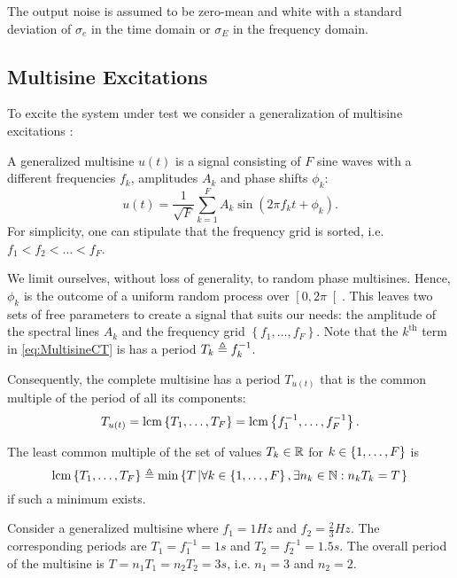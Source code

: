   The output noise is assumed to be zero-mean and white with a
  standard deviation of $\sigma_e$ in the time domain or $\sigma_E$ in the frequency domain.


\subsection{Multisine Excitations}
  To excite the system under test we consider a generalization of multisine excitations \citep{Pintelon2012}:
  \begin{definition} \label{def:generalized-MS}
  A generalized multisine $u(t)$ is a signal consisting of $F$ sine waves with a different frequencies $f_k$, amplitudes $A_k$ and phase shifts $\phi_k$:
  \begin{equation}
    u \left( t\right) = \frac{1}{\sqrt{F}}
   \sum_{k=1}^{F} 
     A_k 
     \sin 
       \left(2\pi f_k t + \phi_k \right)
  \text{.}
  \label{eq:MultisineCT}
  \end{equation}
  For simplicity, one can stipulate that the frequency grid is sorted, i.e. $f_1 < f_2 < \ldots < f_F$.
  \end{definition}

  We limit ourselves, without loss of generality, to random phase multisines.
  Hence, $\phi_k$ is the outcome of a uniform random process over $\left[0,2\pi\right[$.
  This leaves two sets of free parameters to create a signal that suits our needs:
    the amplitude of the spectral lines $A_k$ and
    the frequency grid $\left\{f_1, \ldots, f_F \right\}$.
  Note that the $k^{\text{th}}$ term in \eqref{eq:MultisineCT} is has a period $T_k \triangleq f_k^{-1}$.

  Consequently, the complete multisine has a period $T_{u(t)}$ that is the common multiple of the period of all its components:
  \begin{equation}
    T_{u(t)}  = \operatorname{lcm} \left\{T_1, \ldots, T_F\right\}
      = \operatorname{lcm} \left\{f_1^{-1}, \ldots, f_F^{-1}\right\}
    \text{.}
  \end{equation}
  \begin{definition} \label{def:lcm-real}
  The least common multiple of the set of values $T_k \in \mathbb{R}$ for $k \in \left\{1, \ldots, F\right\}$ is  
  \begin{equation}
    \operatorname{lcm} \left\{T_1, \ldots, T_F\right\} \triangleq
      \min \left\{T \left| \forall k \in \left\{1,\ldots,F\right\}, \exists n_k \in \mathbb{N}: n_k T_k = T  \right.\right\}
   \end{equation}
   if such a minimum exists.
   \end{definition}
  \begin{example}
   Consider a generalized multisine where $f_1 = 1 \unit{Hz}$ and $f_2 = \tfrac{2}{3} \unit{Hz}$.
   The corresponding periods are $T_1 = f_1^{-1} = 1 \unit{s}$ and $T_2 = f_2^{-1} = 1.5 \unit{s}$.
   The overall period of the multisine is $T = n_1 T_1 = n_2 T_2 = 3 \unit{s}$, i.e. $n_1 = 3$ and $n_2=2$.
  \end{example}

